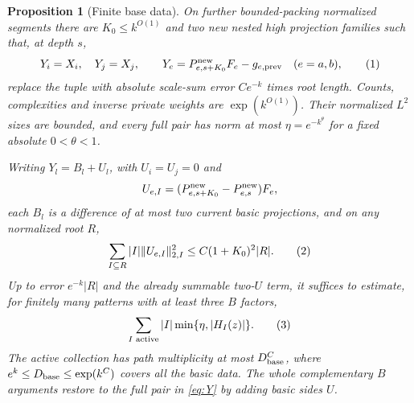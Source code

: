 \documentclass[11pt]{article}
\newtheorem{proposition}[theorem]{Proposition}
\theoremstyle{definition}
\newcommand{\eqtag}[1]{\refstepcounter{equation}\tag{\theequation}\label{#1}}
\numberwithin{equation}{section}
\begin{document}
\begin{proposition}[Finite base data]\label{prop:base}
On further bounded-packing normalized segments there are $K_0\le k^{O(1)}$ and two new nested high projection families such that, at depth $s$,
\[
 Y_i=X_i,\quad Y_j=X_j,\qquad
 Y_e=P^{\rm new}_{e,s+K_0}F_e-g_{e,\mathrm{prev}}\quad(e=a,b),
 \eqtag{eq:Y}
\]
replace the tuple with absolute scale-sum error $Ce^{-k}$ times root length. Counts, complexities and inverse private weights are $\exp(k^{O(1)})$. Their normalized $L^2$ sizes are bounded, and every full pair has norm at most $\eta=e^{-k^\theta}$ for a fixed absolute $0<\theta<1$.

Writing $Y_l=B_l+U_l$, with $U_i=U_j=0$ and
\[
 U_{e,I}=(P^{\rm new}_{e,s+K_0}-P^{\rm new}_{e,s})F_e,
\]
each $B_l$ is a difference of at most two current basic projections, and on any normalized root $R$,
\[
 \sum_{I\subseteq R}|I|\|U_{e,I}\|_{2,I}^2\le C(1+K_0)^2|R|.
 \eqtag{eq:basic-side}
\]
Up to error $e^{-k}|R|$ and the already summable two-$U$ term, it suffices to estimate, for finitely many patterns with at least three $B$ factors,
\[
 \sum_{I\text{ active}}|I|\min\{\eta,|H_I(z)|\}.
 \eqtag{eq:active-min}
\]
The active collection has path multiplicity at most $D_{\rm base}^C$, where $e^k\le D_{\rm base}\le\exp(k^C)$ covers all the basic data. The whole complementary $B$ arguments restore to the full pair in \eqref{eq:Y} by adding basic sides $U$.
\end{proposition}
\end{document}
